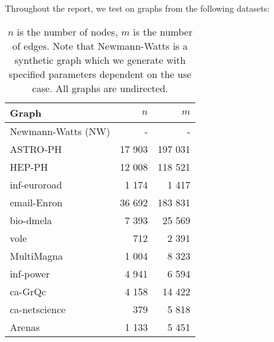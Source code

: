 Throughout the report, we test on graphs from the following datasets:

\begin{table}[htbp]
\begin{center}
\begin{tabular}{ |l|r|r| } 
 \hline
 \textbf{Graph} & $n$ & $m$ \\ 
 \hline
 Newmann-Watts (NW) \citep{newman2001random} & - & - \\ 
 ASTRO-PH \citep{leskovec2007graph} & 17 903 & 197 031 \\ 
 HEP-PH \citep{kosowska2016evolving} & 12 008 & 118 521 \\ 
 inf-euroroad \citep{bader2012graph} & 1 174 & 1 417 \\ 
 email-Enron \citep{leskovec2009community} & 36 692 & 183 831 \\ 
 bio-dmela \citep{nr2015} & 7 393 & 25 569 \\
 vole \citep{davis2014spatial} & 712 & 2 391 \\
 MultiMagna \citep{vijayan2017multiple} & 1 004 & 8 323 \\
 inf-power \citep{nr2015} & 4 941 & 6 594\\
 ca-GrQc \citep{nr2015} & 4 158 & 14 422\\
 ca-netscience \citep{nr2015} & 379 & 5 818\\
 Arenas \citep{kunegis2013konect} & 1 133 & 5 451\\
 \hline
\end{tabular}
\end{center}
\caption{$n$ is the number of nodes, $m$ is the number of edges. Note that Newmann-Watts is a synthetic graph which we generate with specified parameters dependent on the use case. All graphs are undirected.}
\end{table}

